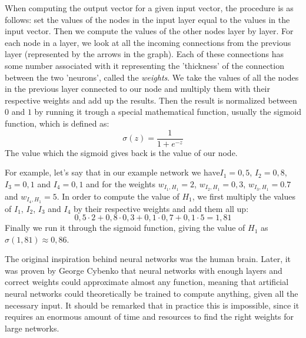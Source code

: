 \documentclass[12pt, titlepage]{article}
\begin{document}
    When computing the output vector for a given input vector, the procedure is as follows: set the values of the nodes in the input layer equal to the values in the input vector. Then we compute the values of the other nodes layer by layer. For each node in a layer, we look at all the incoming connections from the previous layer (represented by the arrows in the graph). Each of these connections has some number associated with it representing the 'thickness' of the connection between the two 'neurons', called the \textit{weights}. We take the values of all the nodes in the previous layer connected to our node and multiply them with their respective weights and add up the results. Then the result is normalized between $0$ and $1$ by running it trough a special mathematical function, usually the sigmoid function, which is defined as:
    \begin{equation*}
    \sigma(z) = \frac1{1+e^{-z}}
    \end{equation*}
    The value which the sigmoid gives back is the value of our node.
    
    For example, let's say that in our example network we have$I_1=0,5$, $I_2=0,8$, $I_3=0,1$ and $I_4=0,1$  and for the weights $w_{I_1,H_1}=2$, $w_{I_2,H_1}=0,3$, $w_{I_3,H_1}=0.7$ and $w_{I_4,H_1}=5$. In order to compute the value of $H_1$, we first multiply the values of $I_1$, $I_2$, $I_3$ and $I_4$ by their respective weights and add them all up:
    \begin{equation*}
    0,5\cdot 2 + 0,8\cdot 0,3 + 0,1\cdot 0,7 + 0,1\cdot 5 = 1,81
    \end{equation*}
    Finally we run it through the sigmoid function, giving the value of $H_1$ as $\sigma(1,81)\approx 0,86$.
    
    The original inspiration behind neural networks was the human brain. Later, it was proven by George Cybenko \cite{cybenko} that neural networks with enough layers and correct weights could approximate almost any function, meaning that artificial neural networks could theoretically be trained to compute anything, given all the necessary input. It should be remarked that in practice this is impossible, since it requires an enormous amount of time and resources to find the right weights for large networks. 
    
\end{document}
